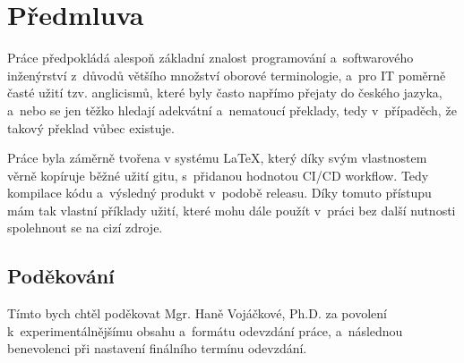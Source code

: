 \chapter*{Předmluva}
\thispagestyle{fancy}
\fancyfoot[C]{}
\setcounter{page}{2}

Práce předpokládá alespoň základní znalost programování a~softwarového inženýrství z~důvodů většího množství oborové terminologie, a~pro IT poměrně časté užití tzv. anglicismů, které byly často napřímo přejaty do českého jazyka, a~nebo se jen těžko hledají adekvátní a~nematoucí překlady, tedy v~případěch, že takový překlad vůbec existuje.

Práce byla záměrně tvořena v systému LaTeX, který díky svým vlastnostem věrně kopíruje běžné užití gitu, s~přidanou hodnotou CI/CD workflow. Tedy kompilace kódu a~výsledný produkt v~podobě releasu. Díky tomuto přístupu mám tak vlastní příklady užití, které mohu dále použít v~práci bez další nutnosti spolehnout se na cizí zdroje.
\vfill
\section*{Poděkování}
Tímto bych chtěl poděkovat Mgr. Haně Vojáčkové, Ph.D. za povolení k~experimentálnějšímu obsahu a~formátu odevzdání práce, a~následnou benevolenci při nastavení finálního termínu odevzdání.
\pagebreak